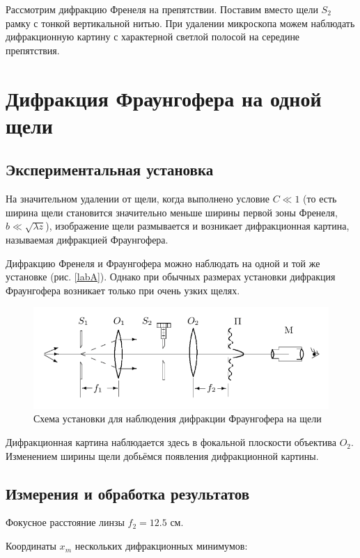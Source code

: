 \documentclass[a4paper,12pt]{article} %
\begin{document}
Рассмотрим дифракцию Френеля на препятствии. Поставим вместо щели $ S_2 $ рамку с тонкой вертикальной нитью. При удалении микроскопа можем наблюдать дифракционную картину с характерной светлой полосой на середине препятствия.

\section{Дифракция Фраунгофера на одной щели}

\subsection{Экспериментальная установка}

На значительном удалении от щели, когда выполнено условие $ C \ll 1 $
(то есть ширина щели становится значительно меньше ширины первой
зоны Френеля, $ b \ll \sqrt{\lambda z} $), изображение щели размывается и возникает
дифракционная картина, называемая дифракцией Фраунгофера.

Дифракцию Френеля и Фраунгофера можно наблюдать на одной
и той же установке (рис. \ref{labA}). Однако при обычных размерах установки дифракция Фраунгофера возникает только при очень узких щелях.

\begin{figure}[h!]
  \centering
  \includegraphics[width=0.8\linewidth]{c.png}
  \caption{Схема установки для наблюдения дифракции Фраунгофера на щели}
  \label{labB}
\end{figure}

Дифракционная картина наблюдается здесь в фокальной плоскости объектива $ O_2 $. Изменением ширины щели добьёмся появления дифракционной картины.

\subsection{Измерения и обработка результатов}

Фокусное расстояние линзы $ f_2 = 12.5$ см.

Координаты \(x_m\) нескольких дифракционных минимумов:
\end{document}
